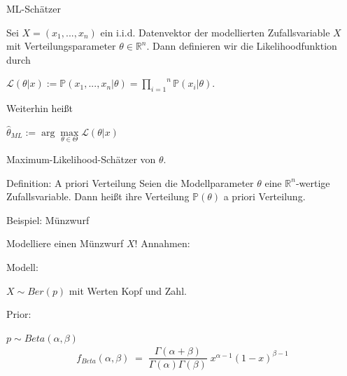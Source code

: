 \documentclass{beamer}
\begin{document}
{%

\begin{frame}{ML-Schätzer}

Sei $X=(x_1,...,x_n)$ ein i.i.d. Datenvektor der modellierten Zufallsvariable $X$ mit Verteilungsparameter $\theta\in\mathbb{R}^n$. Dann definieren wir die Likelihoodfunktion durch

\begin{center}
$\mathcal{L}( \theta \vert x):= \mathbb{P}(x_1,...,x_n\vert \theta) =\overset{n}{\underset{i=1}{\prod}}\mathbb{P}(x_i\vert \theta).$
\end{center}
 Weiterhin heißt
\begin{center}
$\hat{\theta}_{ML} := \arg\underset{\theta \in \Theta}{\max} \mathcal{L}( \theta \vert x)$
\end{center}

Maximum-Likelihood-Schätzer von $\theta$.

\end{frame}



\begin{frame}
\begin{block}{Definition: A priori Verteilung}
Seien die Modellparameter $\theta$ eine $\mathbb{R}^n$-wertige Zufallsvariable. Dann heißt ihre Verteilung $\mathbb{P}(\theta)$ a priori Verteilung.

\end{block}


\end{frame}


\begin{frame}{Beispiel: Münzwurf}

	\begin{minipage}{7cm}
		Modelliere einen Münzwurf $X$! Annahmen:
		
		Modell:
		
		$X \sim Ber(p)$ mit Werten Kopf und Zahl.
		
		Prior:
		
		$p \sim Beta(\alpha,\beta)$\\
		\begin{align}
			f_{Beta}\left(\alpha,\beta\right)\;=\;\dfrac{\varGamma(\alpha+\beta)}{\varGamma(\alpha)\varGamma(\beta)}\;x^{\alpha-1}(1-x)^{\beta-1}
		\end{align}
	\end{minipage}
	\begin{minipage}{3cm}
		\flushright
\end{minipage}
\end{frame}}
\end{document}
